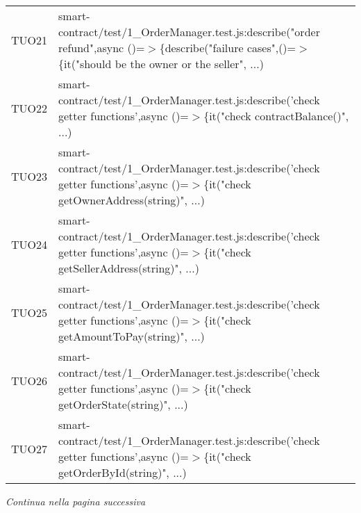 \begin{table}[H]
\begin{tabular}{c|p{15cm}}
    TUO21 & smart-contract/test/1\_OrderManager.test.js:describe("order refund",\newline async ()=$>$\{describe("failure cases",()=$>$\{it("should be the owner or the seller", ...)                                 \\
    TUO22 & smart-contract/test/1\_OrderManager.test.js:describe('check getter functions',\newline async ()=$>$\{it("check contractBalance()", ...)                                                                  \\
    TUO23 & smart-contract/test/1\_OrderManager.test.js:describe('check getter functions',\newline async ()=$>$\{it("check getOwnerAddress(string)", ...)                                                            \\
    TUO24 & smart-contract/test/1\_OrderManager.test.js:describe('check getter functions',\newline async ()=$>$\{it("check getSellerAddress(string)", ...)                                                           \\
    TUO25 & smart-contract/test/1\_OrderManager.test.js:describe('check getter functions',\newline async ()=$>$\{it("check getAmountToPay(string)", ...)                                                             \\
    TUO26 & smart-contract/test/1\_OrderManager.test.js:describe('check getter functions',\newline async ()=$>$\{it("check getOrderState(string)", ...)                                                              \\
    TUO27 & smart-contract/test/1\_OrderManager.test.js:describe('check getter functions',\newline async ()=$>$\{it("check getOrderById(string)", ...)                                                               \\
  \end{tabular}
\end{table}
\begin{center}
  \textit{\small Continua nella pagina successiva}
\end{center}
